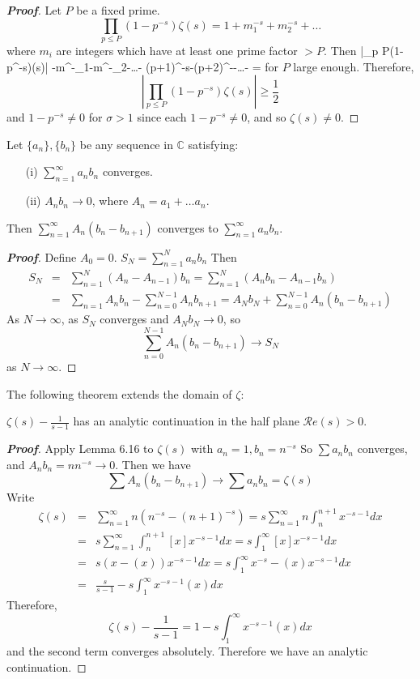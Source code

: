 \begin{proof}[\bf Proof] Let $P$ be a fixed prime.
$$\prod_{p \le P}\left(1-p^{-s}\right)\zeta(s)=1+m^{-s}_1+m^{-s}_2+\ldots$$
where $m_i$ are integers which have at least one prime factor $>P$.
Then
\be
\left|\prod_{p \le P}\left(1-p^{-s}\right)\zeta(s)\right|  -m^{-\sigma}_1-m^{-\sigma}_2-\ldots {}- \left(p+1\right)^{-s}-\left(p+2\right)^{-\sigma}-\ldots {}- =
\ee
for $P$ large enough. Therefore,
$$\left|\prod_{p \le P}(1-p^{-s})\zeta(s)\right| \ge \frac{1}{2}$$
and $1-p^{-s} \neq 0$ for $\sigma >1$ since each $1-p^{-s} \neq 0$, and so $\zeta(s) \neq 0$.
\end{proof}
\begin{lemma} Let $\{a_n\},\{b_n\}$ be any sequence in $\mathbb{C}$ satisfying:
\begin{enumerate}
\item[(i)] $\sum_{n=1}^\infty a_n b_n$ converges.
\item[(ii)] $A_n b_n \to 0$, where $A_n=a_1+\ldots a_n$.
\end{enumerate}
Then $\sum_{n=1}^\infty A_n(b_n-b_{n+1})$ converges to $\sum_{n=1}^\infty a_n b_n$.
\end{lemma}
\begin{proof}[\bf Proof] Define $A_0=0$. $S_N=\sum_{n=1}^N a_nb_n$ Then
\begin{eqnarray*}
S_N&=&\sum_{n=1}^N(A_n-A_{n-1})b_n=\sum_{n=1}^{N}(A_nb_n-A_{n-1}b_n)\\
&=&\sum_{n=1}A_nb_n-\sum_{n=0}^{N-1}A_n b_{n+1} = A_Nb_N+\sum_{n=0}^{N-1}A_n(b_n-b_{n+1})
\end{eqnarray*}
As $N \to \infty$, as $S_N$ converges and $A_Nb_N \to 0$, so
$$\sum_{n=0}^{N-1}A_n(b_n-b_{n+1}) \to S_N$$
as $N \to \infty$.
\end{proof}
The following theorem extends the domain of $\zeta$:
\begin{theorem} $\zeta(s)-\frac{1}{s-1}$ has an analytic continuation in the half plane
$\mathcal{R}e(s)>0$.
\end{theorem}
\begin{proof}[\bf Proof] Apply Lemma 6.16 to $\zeta(s)$ with $a_n=1,b_n=n^{-s}$
So $\sum a_nb_n$ converges, and $A_nb_n=n n^{-s} \to 0$. Then we have
$$\sum A_n(b_n-b_{n+1}) \to \sum a_n b_n=\zeta(s)$$
Write
\begin{eqnarray*}
\zeta(s)&=&\sum_{n=1}^{\infty}n(n^{-s}-(n+1)^{-s}) = s\sum_{n=1}^\infty n\int_{n}^{n+1} x^{-s-1}dx\\
&=&s\sum_{n=1}^\infty \int_n^{n+1} [x] x^{-s-1} dx = s \int_1^\infty [x] x^{-s-1} dx\\
&=&s \left(x-(x) \right)x^{-s-1}dx = s\int_1^\infty x^{-s}-(x)x^{-s-1}dx\\
&=&\frac{s}{s-1}-s\int_1^{\infty} x^{-s-1}(x) dx 
\end{eqnarray*}
Therefore,
$$\zeta(s)-\frac{1}{s-1}=1-s\int_1^\infty x^{-s-1}(x) dx$$
and the second term converges absolutely. Therefore we have an analytic continuation.
\end{proof}
